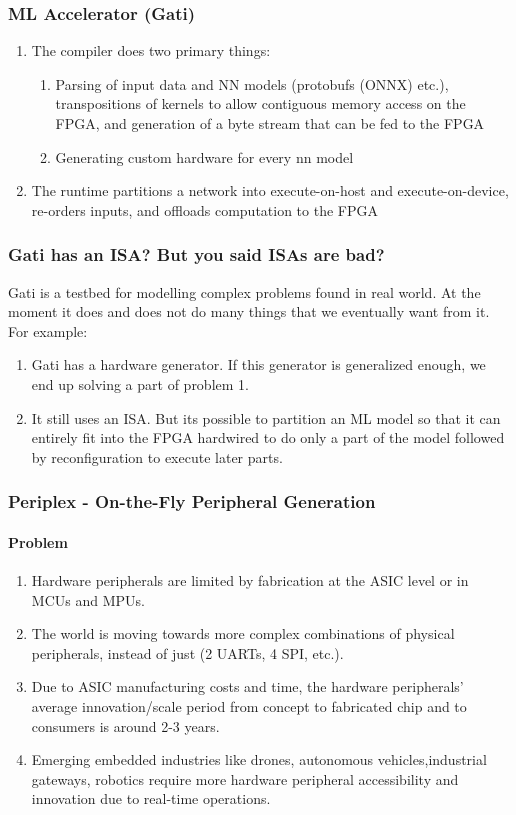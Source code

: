 \documentclass{beamer}
\begin{document}
\begin{frame}[fragile]
  \frametitle{ML Accelerator (Gati)}
  \begin{enumerate}
    \item The compiler does two primary things:
      \begin{enumerate}
        \item Parsing of input data and NN models (protobufs (ONNX) etc.),
          transpositions of kernels to allow contiguous memory access on the 
          FPGA, and generation
          of a byte stream that can be fed to the FPGA
        \item Generating custom hardware for every nn model
      \end{enumerate}
    \item The runtime partitions a network into execute-on-host and
      execute-on-device, re-orders inputs, and offloads computation
      to the FPGA
  \end{enumerate}
\end{frame}

\begin{frame}[fragile]
  \frametitle{Gati has an ISA? But you said ISAs are bad?}
  Gati is a testbed for modelling complex problems found in real world.
  At the moment it does and does not do many things that we eventually want
  from it.
  For example:
  \begin{enumerate}
    \item Gati has a hardware generator. If this generator is generalized
      enough, we end up solving a part of problem 1.
    \item It still uses an ISA. But its possible to partition an ML
      model so that it can entirely fit into 
      the FPGA hardwired to do only a part of the model followed by
      reconfiguration to execute later parts.
  \end{enumerate}
\end{frame}

\begin{frame}[fragile]
  \frametitle{Periplex - On-the-Fly Peripheral Generation}
  \framesubtitle{Problem}
  \begin{enumerate}
    \item Hardware peripherals are limited by fabrication at the ASIC level or
      in MCUs and MPUs.
    \item The world is moving towards more complex combinations of physical
      peripherals, instead of just (2 UARTs, 4 SPI, etc.).
    \item Due to ASIC manufacturing costs and time, the hardware peripherals’
      average innovation/scale period from concept to fabricated chip and to
      consumers is around 2-3 years.
    \item Emerging embedded industries like drones, autonomous
  vehicles,industrial gateways, robotics require more hardware peripheral
  accessibility and innovation due to real-time operations.
  \end{enumerate}
\end{frame}
\end{document}
